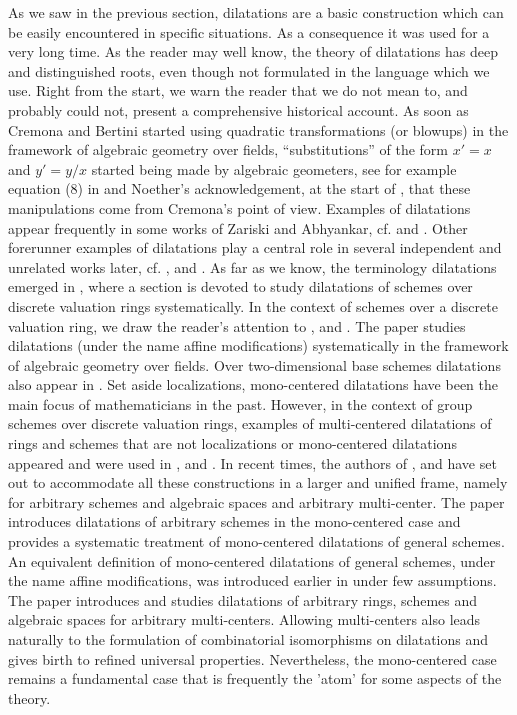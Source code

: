 \documentclass[10pt]{alggeom}
\theoremstyle{definition}
\numberwithin{equation}{section}
\begin{document}
As we saw in the previous section, dilatations are a basic construction which can be easily encountered in specific situations. As a consequence it was used for a very long time.
As the reader may well know, the theory of dilatations has deep and distinguished roots, even though not formulated in the language which we use. Right from the start, we warn the reader that we do not mean to, and probably could not, present a comprehensive historical account.
 As soon as Cremona and Bertini started using quadratic transformations (or blowups) in the framework of algebraic geometry over fields, ``substitutions'' of the form $x'=x$ and $y'=y/x$ started being made by algebraic geometers, see for example equation (8) in \cite[Section 11]{No1884} and Noether's acknowledgement, at the start of \cite[Section 12]{No1884}, that these  manipulations come from Cremona's point of view. Examples of dilatations appear frequently in some works of Zariski and Abhyankar, cf. \cite[Definition, p. 86]{abhyankar-zariski55} and \cite[p499 proof of Th.4, case (b)]{Za43}. Other forerunner examples of dilatations play a central role in several independent and unrelated works later,  cf. \cite{Da67},  \cite[Section 25]{Ner64} and \cite[Section 4]{artin69}. 
As far as we know, the terminology dilatations emerged in \cite[§3.2]{BLR90}, where a section is devoted to study dilatations of schemes over discrete valuation rings systematically. In the context of schemes over a discrete valuation ring, we draw the reader's attention to \cite{Ana73},  \cite{WW80} and \cite{PY06}.
The paper \cite{KZ99} studies dilatations (under the name affine modifications) systematically in the framework of algebraic geometry over fields.
Over two-dimensional base schemes dilatations also appear in \cite[p. 175]{PZ13}.
Set aside localizations, mono-centered dilatations have been the main focus of mathematicians in the past. However, in the context of group schemes over discrete valuation rings, examples of multi-centered dilatations of rings and schemes that are not localizations or mono-centered dilatations appeared and were used in \cite[Exp. VIB Ex. 13.3]{SGA3}, \cite{PY06} and \cite{duong-hai-dos_santos18}. In recent times, the authors of \cite{Du05}, \cite{MRR20} and \cite{Ma23d} have set out to accommodate all these constructions in a larger and unified frame, namely for arbitrary schemes and algebraic spaces and arbitrary multi-center. The paper \cite{MRR20} introduces dilatations of arbitrary schemes in the mono-centered case and provides a systematic treatment of mono-centered dilatations of general schemes. An equivalent definition of mono-centered dilatations of general schemes, under the name affine modifications, was introduced earlier in \cite[Définition 2.9]{Du05} under few assumptions. The paper \cite{Ma23d} introduces and studies dilatations of arbitrary rings, schemes and algebraic spaces for arbitrary multi-centers. Allowing multi-centers also leads naturally to the formulation of combinatorial isomorphisms on dilatations and gives birth to refined universal properties.
Nevertheless, the mono-centered case remains a fundamental case that is frequently the 'atom' for some aspects of the theory. 
\end{document}
